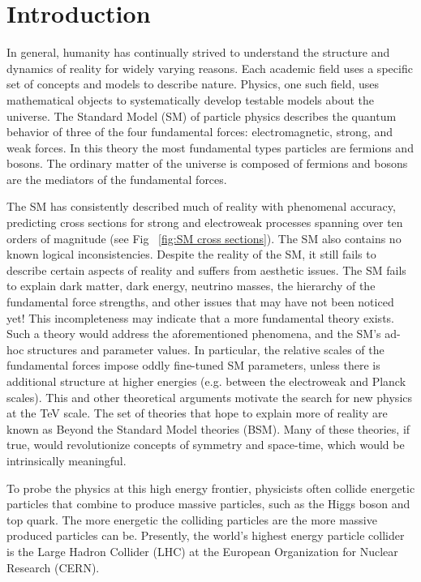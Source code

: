 \chapter{Introduction}
In general, humanity has continually strived to understand the structure and dynamics of reality for widely varying reasons. Each academic field uses a specific set of concepts and models to describe nature. Physics, one such field, uses mathematical objects to systematically develop testable models about the universe. The Standard Model (SM) of particle physics describes the quantum behavior of three of the four fundamental forces: electromagnetic, strong, and weak forces. In this theory the most fundamental types particles are fermions and bosons. The ordinary matter of the universe is composed of fermions and bosons are the mediators of the fundamental forces. 

The SM has consistently described much of reality with phenomenal accuracy, predicting cross sections for strong and electroweak processes spanning over ten orders of magnitude (see Fig ~\ref{fig:SM cross sections}). The SM also contains no known logical inconsistencies. Despite the reality of the SM, it still fails to describe certain aspects of reality and suffers from aesthetic issues. 
The SM fails to explain dark matter, dark energy, neutrino masses, the hierarchy of the fundamental force strengths, and other issues that may have not been noticed yet! This incompleteness may indicate that a more fundamental theory exists. Such a theory would address the aforementioned phenomena, and the SM's ad-hoc structures and parameter values. In particular, the relative scales of the fundamental forces impose oddly fine-tuned SM parameters, unless there is additional structure at higher energies (e.g. between the electroweak and Planck scales). This and other theoretical arguments motivate the search for new physics at the TeV scale. The set of theories that hope to explain more of reality are known as Beyond the Standard Model theories (BSM). Many of these theories, if true, would revolutionize concepts of symmetry and space-time, which would be intrinsically meaningful.

To probe the physics at this high energy frontier, physicists often collide energetic particles that combine to produce massive particles, such as the Higgs boson and top quark. The more energetic the colliding particles are the more massive produced particles can be. Presently, the world's highest energy particle collider is the Large Hadron Collider (LHC) at the European Organization for Nuclear Research (CERN). 

